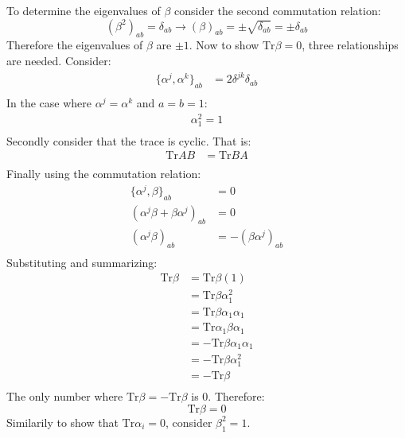 \documentclass[9pt]{report}
\begin{document}
\begin{enumerate}
  To determine the eigenvalues of $\beta$ consider the second commutation relation:
  \[
    (\beta^2)_{ab} = \delta_{ab} \to (\beta)_{ab} = \pm \sqrt{\delta_{ab}}  = \pm \delta_{ab}
  \]
  Therefore the eigenvalues of $\beta$ are $\pm 1$.
  Now to show $\text{Tr}\beta=0$, three relationships are needed. Consider:
  \[
    \begin{align}
    \{\alpha^j,\alpha^k\}_{ab} &= 2\delta^{jk}\delta_{ab} \\
    \end{align}
  \]
  In the case where $\alpha^j = \alpha^k$ and $a = b = 1$:
  \begin{equation}
    \begin{align}
    \alpha^2_1 = 1\\
    \end{align}
  \end{equation}
  Secondly consider that the trace is cyclic. That is: 
  \begin{equation}
    \begin{align}
    \text{Tr}AB &= \text{Tr}BA\\
    \end{align}
  \end{equation}
  Finally using the commutation relation:
  \[
    \begin{align}
      \{\alpha^j, \beta\}_{ab} &= 0\\
      (\alpha^j\beta + \beta\alpha^j)_{ab} &= 0\\
      (\alpha^j\beta)_{ab} &= -(\beta\alpha^j)_{ab}\\
    \end{align}
  \]
  Substituting and summarizing:
  \[
    \begin{align}
      \text{Tr}\beta&= \text{Tr}\beta(1)\\
                    &= \text{Tr}\beta\alpha_1^2\\
                    &= \text{Tr}\beta\alpha_1\alpha_1\\
                    &= \text{Tr}\alpha_1\beta\alpha_1\\
                    &= -\text{Tr}\beta\alpha_1\alpha_1\\
                    &= -\text{Tr}\beta\alpha_1^2\\
                    &= -\text{Tr}\beta\\
    \end{align}
  \]
  The only number where $\text{Tr}\beta = -\text{Tr}\beta$ is $0$. Therefore:
  \[
    \text{Tr}\beta = 0
  \]
  Similarily to show that $\text{Tr}\alpha_i = 0$, consider $\beta^2_1 = 1$.

\end{enumerate}
\end{document}

